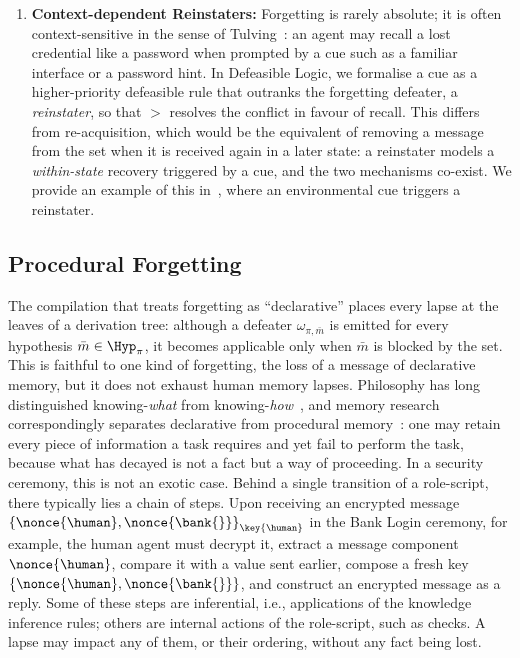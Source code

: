 \begin{enumerate}
    \item \textbf{Context-dependent Reinstaters:} Forgetting is rarely absolute; it is often context-sensitive in the sense of Tulving~\cite{tulving1974cue}: an agent may recall a lost credential like a password when prompted by a cue such as a familiar interface or a password hint. In Defeasible Logic, we formalise a cue as a higher-priority defeasible rule that outranks the forgetting defeater, a \emph{reinstater}, so that $>$ resolves the conflict in favour of recall. This differs from re-acquisition, which would be the equivalent of removing a message from the \Forget{} set when it is received again in a later state: a reinstater models a \emph{within-state} recovery triggered by a cue, and the two mechanisms co-exist. We provide an example of this in~, where an environmental cue triggers a reinstater.
\end{enumerate}

\subsection{Procedural Forgetting}
\label{Subsec:ProceduralForgetting}

The compilation that treats forgetting as ``declarative'' places every lapse at the leaves of a derivation tree: although a defeater $\omega_{\pi,\bar{m}}$ is emitted for every hypothesis $\bar{m}\in\Hyp_\pi$, it becomes applicable only when $\bar{m}$ is blocked by the \Forget{} set. This is faithful to one kind of forgetting, the loss of a message of declarative memory, but it does not exhaust human memory lapses. Philosophy has long distinguished knowing-\emph{what} from knowing-\emph{how}~\cite{ryle1949concept}, and memory research correspondingly separates declarative from procedural memory~\cite{cohen1980preserved,anderson1982acquisition}: one may retain every piece of information a task requires and yet fail to perform the task, because what has decayed is not a fact but a way of proceeding. In a security ceremony, this is not an exotic case. Behind a single transition of a role-script, there typically lies a chain of steps. Upon receiving an encrypted message ${\{\nonce{\human},\nonce{\bank{}}\}}_{\key{\human}}$ in the Bank Login ceremony, for example, the human agent must decrypt it, extract a message component $\nonce{\human}$, compare it with a value sent earlier, compose a fresh key $\{\nonce{\human},\nonce{\bank{}}\}$, and construct an encrypted message as a reply. Some of these steps are inferential, i.e., applications of the knowledge inference rules; others are internal actions of the role-script, such as checks. A lapse may impact any of them, or their ordering, without any fact being lost. 

